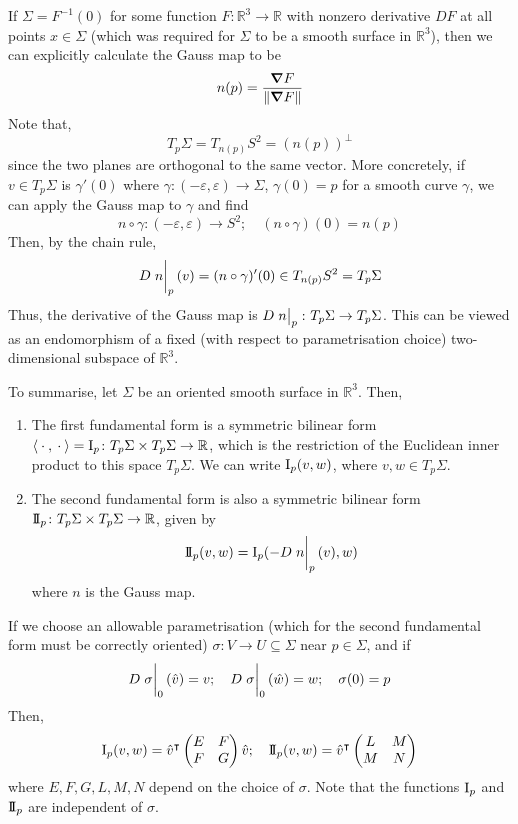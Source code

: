 \begin{remark}
	If \( \Sigma = F^{-1}(0) \) for some function \( F \colon \mathbb R^3 \to \mathbb R \) with nonzero derivative \( DF \) at all points \( x \in \Sigma \) (which was required for \( \Sigma \) to be a smooth surface in \( \mathbb R^3 \)), then we can explicitly calculate the Gauss map to be
	\[
		n(p) = \frac{\grad F}{\norm{\grad F}}
	\]
	Note that,
	\[
		T_p \Sigma = T_{n(p)} S^2 = (n(p))^\perp
	\]
	since the two planes are orthogonal to the same vector.
	More concretely, if \( v \in T_p \Sigma \) is \( \gamma'(0) \) where \( \gamma \colon (-\varepsilon, \varepsilon) \to \Sigma \), \( \gamma(0) = p \) for a smooth curve \( \gamma \), we can apply the Gauss map to \( \gamma \) and find
	\[
		n \circ \gamma \colon (-\varepsilon, \varepsilon) \to S^2;\quad (n \circ \gamma)(0) = n(p)
	\]
	Then, by the chain rule,
	\[
		D\eval{n}_p(v) = (n \circ \gamma)'(0) \in T_{n(p)} S^2 = T_p \Sigma
	\]
	Thus, the derivative of the Gauss map is \( D\eval{n}_p \colon T_p \Sigma \to T_p \Sigma \).
	This can be viewed as an endomorphism of a fixed (with respect to parametrisation choice) two-dimensional subspace of \( \mathbb R^3 \).

	To summarise, let \( \Sigma \) be an oriented smooth surface in \( \mathbb R^3 \).
	Then,
	\begin{enumerate}
		\item The first fundamental form is a symmetric bilinear form \( \left\langle{{}\cdot{},{}\cdot{}}\right\rangle = \operatorname{\mathrm{I}}_p \colon T_p \Sigma \times T_p \Sigma \to \mathbb R \), which is the restriction of the Euclidean inner product to this space \( T_p \Sigma \).
		      We can write \( \operatorname{\mathrm{I}}_p(v,w) \), where \( v, w \in T_p \Sigma \).
		\item The second fundamental form is also a symmetric bilinear form \( \operatorname{\mathrm{I\!I}}_p \colon T_p \Sigma \times T_p \Sigma \to \mathbb R \), given by
		      \[
			      \IIff_p(v,w) = \Iff_p(-D\eval{n}_p(v), w)
		      \]
		      where \( n \) is the Gauss map.
	\end{enumerate}
	If we choose an allowable parametrisation (which for the second fundamental form must be correctly oriented) \( \sigma \colon V \to U \subseteq \Sigma \) near \( p \in \Sigma \), and if
	\[
		D \eval{\sigma}_0(\hat v) = v;\quad D \eval{\sigma}_0(\hat w) = w;\quad \sigma(0) = p
	\]
	Then,
	\[
		\operatorname{\mathrm{I}}_p(v,w) = {\hat v}^\intercal \begin{pmatrix}
			E & F \\
			F & G
		\end{pmatrix} \hat v;\quad \operatorname{\mathrm{I\!I}}_p(v,w) = {\hat v}^\intercal \begin{pmatrix}
			L & M \\
			M & N
		\end{pmatrix}
	\]
	where \( E, F, G, L, M, N \) depend on the choice of \( \sigma \).
	Note that the functions \( \operatorname{\mathrm{I}}_p \) and \( \operatorname{\mathrm{I\!I}}_p \) are independent of \( \sigma \).
\end{remark}

